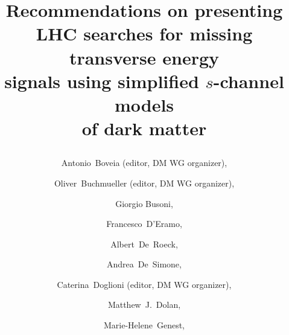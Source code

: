 \documentclass[a4paper, 11pt,notoc]{article}
\begin{document}
\title{\begin{boldmath} \huge Recommendations on presenting LHC searches for missing transverse energy \\ signals using simplified $s$-channel models \\ of dark matter \vspace{7mm} \end{boldmath}}





\author[1]{Antonio~Boveia (editor, DM WG organizer),}
\address[1]{CERN, EP Department, CH-1211 Geneva 23, Switzerland}

\author[2]{Oliver~Buchmueller (editor, DM WG organizer),}
\address[2]{High Energy Physics Group, Blackett Laboratory, Imperial College, Prince Consort Road, London, SW7 2AZ, United Kingdom}

\author[3]{Giorgio Busoni,} 
\address[3]{ARC Centre of Excellence for Particle Physics at the Terascale, School of Physics, University of Melbourne, 3010, Australia}

\author[4]{Francesco~D'Eramo,} 
\address[4]{UC, Santa Cruz and UC, Santa Cruz, Inst. Part. Phys., USA}

\author[1,5]{Albert~De~Roeck,}
\address[5]{Antwerp University, B2610 Wilrijk, Belgium}

\author[6]{Andrea~De~Simone,}
\address[6]{SISSA and INFN Sezione di Trieste, via Bonomea 265, I-34136 Trieste, Italy}

\author[7]{Caterina~Doglioni (editor, DM WG organizer),}
\address[7]{Fysiska institutionen, Lunds universitet, Lund, Sweden}

\author[3]{Matthew~J.~Dolan,}

\author[8]{Marie-Helene~Genest,} 
\address[8]{LPSC, Universite Grenoble-Alpes, CNRS/IN2P3, France}
\end{document}
